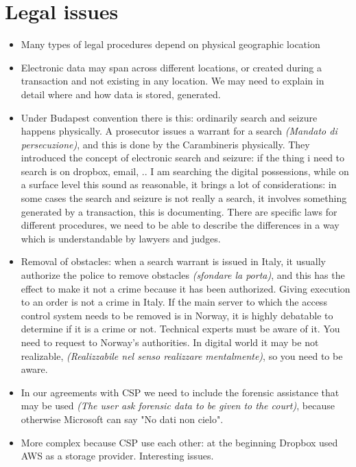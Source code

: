     \section{Legal issues}
        \begin{itemize}
            \item Many types of legal procedures depend on physical geographic location 
            \item Electronic data may span across different locations, or created during a transaction and not existing in any location. We may need to explain in detail where and how data is stored, generated.
            \item Under Budapest convention there is this: ordinarily search and seizure happens physically. A prosecutor issues a warrant for a search \textit{(Mandato di persecuzione)}, and this is done by the Carambineris physically. They introduced the concept of electronic search and seizure: if the thing i need to search is on dropbox, email, .. I am searching the digital possessions, while on a surface level this sound as reasonable, it brings a lot of considerations: in some cases the search and seizure is not really a search, it involves something generated by a transaction, this is documenting. There are specific laws for different procedures, we need to be able to describe the differences in a way which is understandable by lawyers and judges.
            \item Removal of obstacles: when a search warrant is issued in Italy, it usually authorize the police to remove obstacles \textit{(sfondare la porta)}, and this has the effect to make it not a crime because it has been authorized. Giving execution to an order is not a crime in Italy. If the main server to which the access control system needs to be removed is in Norway, it is highly debatable to determine if it is a crime or not. Technical experts must be aware of it. You need to request to Norway's authorities. In digital world it may be not realizable, \textit{(Realizzabile nel senso realizzare mentalmente)}, so you need to be aware.
            \item In our agreements with CSP we need to include the forensic assistance that may be used \textit{(The user ask forensic data to be given to the court)}, because otherwise Microsoft can say "No dati non cielo".
            \item More complex because CSP use each other: at the beginning Dropbox used AWS as a storage provider. Interesting issues.
        \end{itemize}

